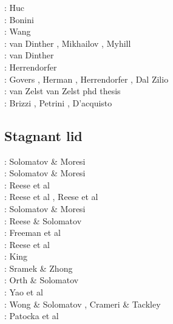\begin{scriptsize}
\nineteenninetyeight: Huc \etal \cite{huhc98}\\
\twothousandthree: Bonini \etal \cite{bocs03}\\
\twothousandtwelve: Wang \etal \cite{wahh12}\\
\twothousandthirteen: van Dinther \etal \cite{vagd13a,vagd13b}, Mikhailov \cite{milp13},
                      Myhill \cite{myhi13}\\
\twothousandfourteen: van Dinther \etal \cite{vamd14}\\
\twothousandfifteen: Herrendorfer \etal \cite{hevg15}\\
\twothousandeighteen: Govers \etal \cite{gofv18}, Herman \etal \cite{hefg18}, 
                      Herrendorfer \etal \cite{hegv18}, Dal Zilio \etal \cite{davg18}\\
\twothousandnineteen: van Zelst \etal \cite{vawg19} van Zelst phd thesis \cite{vanzelst}\\
\twothousandtwenty: Brizzi \etal \cite{brvf20}, Petrini \etal \cite{pegy20}, 
                    D'acquisto \etal \cite{dadm20}
\end{scriptsize}


\subsection{Stagnant lid} 

\begin{scriptsize}
\noindent
\nineteenninetysix: Solomatov \& Moresi \cite{somo96}\\
\nineteenninetyseven: Solomatov \& Moresi \cite{somo97}\\
\nineteenninetyeight: Reese et al \cite{resm98}\\
\nineteenninetynine: Reese et al \cite{resm99}, Reese et al \cite{resb99}\\
\twothousand: Solomatov \& Moresi \cite{somo00}\\
\twothousandtwo: Reese \& Solomatov \cite{reso02}\\
\twothousandfour: Freeman et al \cite{frmm04}\\
\twothousandfive: Reese et al \cite{resb05}\\
\twothousandnine: King \cite{king09}\\
\twothousandten: Sramek \& Zhong \cite{srzh10}\\
\twothousandeleven: Orth \& Solomatov \cite{orso11}\\
\twothousandfourteen: Yao et al \cite{yadl14}\\
\twothousandsixteen: Wong \& Solomatov \cite{woso16b}, Crameri \& Tackley \cite{crta16}\\
\twothousandseventeen: Patocka et al \cite{pact17}
\end{scriptsize}


